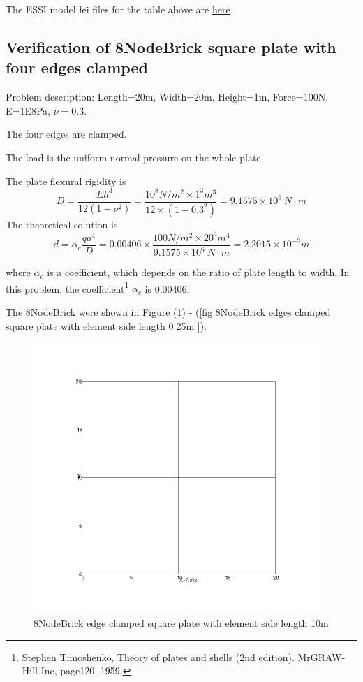 \documentclass[fleqn,11pt,letter]{article}
\begin{document}
The ESSI model fei files for the table above are \href{https://github.com/yuan-energy/ESSI_Verification/blob/master/8NodeBrick/cantilever_stress/cantilever_stress.tar.gz?raw=true}{here}




\newpage
\subsection{Verification of 8NodeBrick square plate with four edges clamped}

Problem description: Length=20m, Width=20m, Height=1m, Force=100N, E=1E8Pa, $\nu=0.3$. 

The four edges are clamped. 

The load is the uniform normal pressure on the whole plate. 


The plate flexural rigidity is 
\begin{equation}
  D=\frac{Eh^3}{12(1-\nu^2)}=\frac{10^8 N/m^2 \times 1^3 m^3 }{12 \times (1-0.3^2) }= 9.1575 \times 10^6 \ N\cdot m
\end{equation}
The theoretical solution is 
\begin{equation}
  d=\alpha_c \frac{q a^4}{D}=0.00406\times \frac{100 N/m^2 \times 20^4 m^4}{9.1575 \times 10^6 \ N\cdot m}=2.2015\times 10^{-3} m
\end{equation}

where $\alpha_c$ is a coefficient, which depends on the ratio of plate length to width. In this problem, the coefficient\footnote{Stephen Timoshenko, Theory of plates and shells (2nd edition). MrGRAW-Hill Inc, page120, 1959.} $\alpha_c$ is 0.00406.


The 8NodeBrick were shown in Figure (\ref{fig 8NodeBrick edges clamped square plate with element side length 10m }) - (\ref{fig 8NodeBrick edges clamped square plate with element side length 0.25m }). 


\begin{figure}[H]
  \centering
  \includegraphics[width=11cm]{../Figure_files/8NodeBrick/square_plate1.png}
  \caption{8NodeBrick edge clamped square plate with element side length 10m }
  \label{fig 8NodeBrick edges clamped square plate with element side length 10m }
\end{figure}
\end{document}
